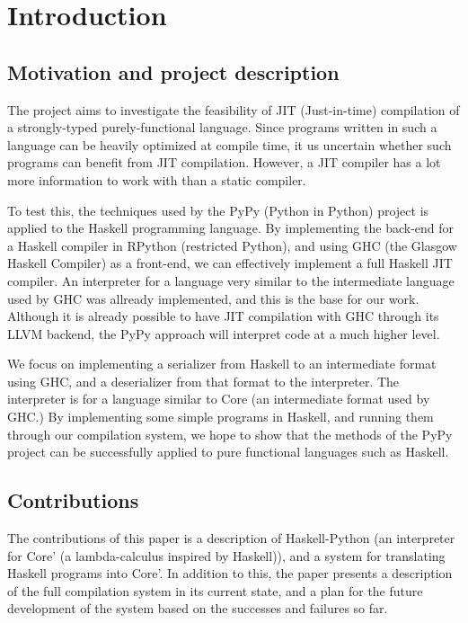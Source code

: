 
\section{Introduction}

\subsection{Motivation and project description}

The project aims to investigate the feasibility of JIT (Just-in-time) 
compilation of a strongly-typed purely-functional language. Since
programs written in such a language can be heavily optimized at 
compile time, it us uncertain whether such programs can benefit from
JIT compilation. However, a JIT compiler has a lot more information to
work with than a static compiler. 

To test this, the techniques 
used by the PyPy (Python in Python) project is applied to the Haskell 
programming language. By implementing the back-end for a Haskell compiler 
in RPython (restricted Python), and using GHC (the Glasgow Haskell Compiler) 
as a front-end, we can effectively implement a full Haskell JIT compiler. An 
interpreter for a language very similar to the intermediate language used
by GHC was allready implemented, and this is the base for our work.
Although it is already possible to have JIT compilation with GHC through
its LLVM backend, the PyPy approach will interpret code at a much higher level.

We focus on implementing a serializer from Haskell to an intermediate
format using GHC, and a deserializer from that format to the interpreter. The 
interpreter is for a language similar to Core (an intermediate format used by GHC.)
By implementing some simple programs in Haskell, and running them through our 
compilation system, 
we hope to show that the methods of the PyPy project can be successfully applied 
to pure functional languages such as Haskell.


\subsection{Contributions}
The contributions of this paper is a description of Haskell-Python (an
interpreter for Core' (a lambda-calculus inspired by Haskell)), and a system for
translating Haskell programs into Core'. In addition to this, the paper 
presents a description of the full compilation system in its current state,
and a plan for the future development of the system based on the 
successes and failures so far.

